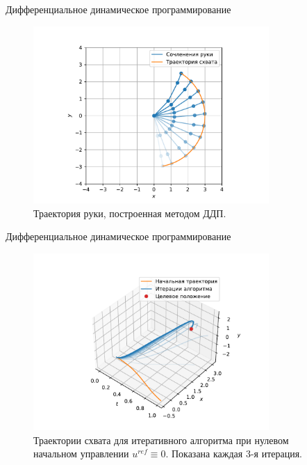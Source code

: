 \documentclass[16pt]{beamer}
\begin{document}
    \begin{frame}{Дифференциальное динамическое программирование}
        \begin{figure}
            \includegraphics[width=0.8\textwidth]{img/ddp_pendulum.pdf}
            \caption{Траектория руки, построенная методом ДДП.}
        \end{figure}
    \end{frame}

    \begin{frame}{Дифференциальное динамическое программирование}
        \begin{figure}
            \includegraphics[width=0.8\textwidth]{img/ddp_empty.pdf}
            \caption{Траектории схвата для итеративного алгоритма при нулевом начальном управлении $u^{ref}\equiv 0$. Показана каждая 3-я итерация.}
        \end{figure}
    \end{frame}
    
\end{document}
